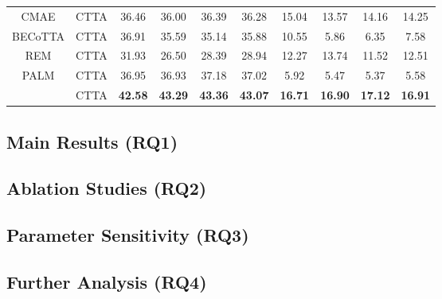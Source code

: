 \begin{table}[t]
{\begin{tabular}{@{}c||c||ccc|c||ccc|c@{}}
        CMAE & CTTA  & 36.46 & 36.00 & 36.39 & 36.28 & 15.04 & 13.57 & 14.16 & 14.25
        \\

        BECoTTA & CTTA & 36.91 & 35.59 & 35.14 & 35.88 & 10.55 & 5.86 & 6.35 & 7.58        
        \\

        REM & CTTA & 31.93 & 26.50 & 28.39 & 28.94 & 12.27 & 13.74 & 11.52 & 12.51        
        \\

        PALM & CTTA  & 36.95 & 36.93 & 37.18 & 37.02 & 5.92 & 5.47 & 5.37 & 5.58        
        \\ \midrule

        \textbf{\M} & CTTA & \textbf{42.58} & \textbf{43.29} & \textbf{43.36} & \textbf{43.07} & \textbf{16.71} & \textbf{16.90} & \textbf{17.12} & \textbf{16.91}
        \\


    \bottomrule
    \end{tabular}
    }
\end{table}





\subsection{Main Results (RQ1)} \label{sec:result}

\subsection{Ablation Studies (RQ2)}  \label{sec:ablation}

\subsection{Parameter Sensitivity (RQ3)} \label{sec:parameter}

\subsection{Further Analysis (RQ4)} \label{sec:further}

